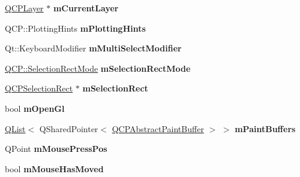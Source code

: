 \begin{DoxyCompactItemize}
\item 
\hyperlink{class_q_c_p_layer}{Q\+C\+P\+Layer} $\ast$ {\bfseries m\+Current\+Layer}\hypertarget{class_q_custom_plot_a3d648a5cdc87a1a59288e526c5bc3c7a}{}\label{class_q_custom_plot_a3d648a5cdc87a1a59288e526c5bc3c7a}

\item 
Q\+C\+P\+::\+Plotting\+Hints {\bfseries m\+Plotting\+Hints}\hypertarget{class_q_custom_plot_aa184197a6101a9cc5807469e1d006c9e}{}\label{class_q_custom_plot_aa184197a6101a9cc5807469e1d006c9e}

\item 
Qt\+::\+Keyboard\+Modifier {\bfseries m\+Multi\+Select\+Modifier}\hypertarget{class_q_custom_plot_a0e97e701c5671e7e463d2ce0211d0f8a}{}\label{class_q_custom_plot_a0e97e701c5671e7e463d2ce0211d0f8a}

\item 
\hyperlink{namespace_q_c_p_ac9aa4d6d81ac76b094f9af9ad2d3aacf}{Q\+C\+P\+::\+Selection\+Rect\+Mode} {\bfseries m\+Selection\+Rect\+Mode}\hypertarget{class_q_custom_plot_abe04c5def373cc4fede8de20542ca3f2}{}\label{class_q_custom_plot_abe04c5def373cc4fede8de20542ca3f2}

\item 
\hyperlink{class_q_c_p_selection_rect}{Q\+C\+P\+Selection\+Rect} $\ast$ {\bfseries m\+Selection\+Rect}\hypertarget{class_q_custom_plot_abbc157c3f4f0e555c671dce123b178d6}{}\label{class_q_custom_plot_abbc157c3f4f0e555c671dce123b178d6}

\item 
bool {\bfseries m\+Open\+Gl}\hypertarget{class_q_custom_plot_a0841dbea13bd120d20e3f0cc36767ff9}{}\label{class_q_custom_plot_a0841dbea13bd120d20e3f0cc36767ff9}

\item 
\hyperlink{class_q_list}{Q\+List}$<$ Q\+Shared\+Pointer$<$ \hyperlink{class_q_c_p_abstract_paint_buffer}{Q\+C\+P\+Abstract\+Paint\+Buffer} $>$ $>$ {\bfseries m\+Paint\+Buffers}\hypertarget{class_q_custom_plot_a8907ada9d001456fa37ddd8fd7cb09a3}{}\label{class_q_custom_plot_a8907ada9d001456fa37ddd8fd7cb09a3}

\item 
Q\+Point {\bfseries m\+Mouse\+Press\+Pos}\hypertarget{class_q_custom_plot_ac57090da95056ae4dd67be67adfa85bd}{}\label{class_q_custom_plot_ac57090da95056ae4dd67be67adfa85bd}

\item 
bool {\bfseries m\+Mouse\+Has\+Moved}\hypertarget{class_q_custom_plot_ad2108936f001a8be5974b0b6ff13dae3}{}\label{class_q_custom_plot_ad2108936f001a8be5974b0b6ff13dae3}


\end{DoxyCompactItemize}
